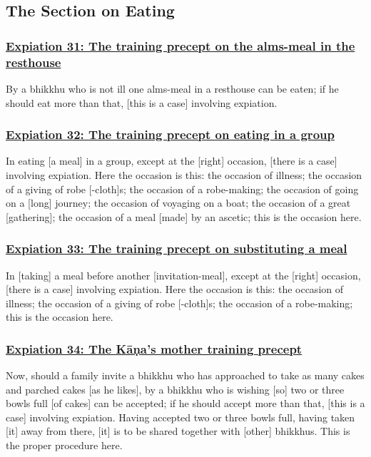 \setsubsecheadstyle{\subsectionFmt}
\subsection{The Section on Eating}

\subsubsection*{\hyperref[pac31]{Expiation 31: The training precept on the alms-meal in the resthouse}}
\label{exp31}
By a bhikkhu who is not ill one alms-meal in a resthouse can be eaten; if he should eat more than that, [this is a case] involving expiation.



\subsubsection*{\hyperref[pac32]{Expiation 32: The training precept on eating in a group}}
\label{exp32}
In eating [a meal] in a group, except at the [right] occasion, [there is a case] involving expiation. Here the occasion is this: the occasion of illness; the occasion of a giving of robe [-cloth]s; the occasion of a robe-making; the occasion of going on a [long] journey; the occasion of voyaging on a boat; the occasion of a great [gathering]; the occasion of a meal [made] by an ascetic; this is the occasion here.



\subsubsection*{\hyperref[pac33]{Expiation 33: The training precept on substituting a meal}}
\label{exp33}
In [taking] a meal before another [invitation-meal], except at the [right] occasion, [there is a case] involving expiation. Here the occasion is this: the occasion of illness; the occasion of a giving of robe [-cloth]s; the occasion of a robe-making; this is the occasion here.



\subsubsection*{\hyperref[pac34]{Expiation 34: The Kāṇa's mother training precept}}
\label{exp34}
Now, should a family invite a bhikkhu who has approached to take as many cakes and parched cakes [as he likes], by a bhikkhu who is wishing [so] two or three bowls full [of cakes] can be accepted; if he should accept more than that, [this is a case] involving expiation. Having accepted two or three bowls full, having taken [it] away from there, [it] is to be shared together with [other] bhikkhus. This is the proper procedure here.



